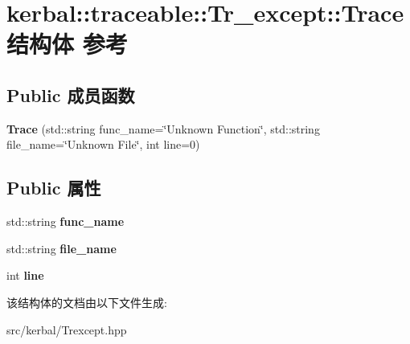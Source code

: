 \hypertarget{structkerbal_1_1traceable_1_1_tr__except_1_1_trace}{}\section{kerbal\+:\+:traceable\+:\+:Tr\+\_\+except\+:\+:Trace结构体 参考}
\label{structkerbal_1_1traceable_1_1_tr__except_1_1_trace}
\subsection*{Public 成员函数}
\begin{DoxyCompactItemize}
\item 
\mbox{\label{structkerbal_1_1traceable_1_1_tr__except_1_1_trace_aacad5214700c1ede35b8f040d396e415}} 
{\bfseries Trace} (std\+::string func\+\_\+name=\char`\"{}Unknown Function\char`\"{}, std\+::string file\+\_\+name=\char`\"{}Unknown File\char`\"{}, int line=0)
\end{DoxyCompactItemize}
\subsection*{Public 属性}
\begin{DoxyCompactItemize}
\item 
\mbox{\label{structkerbal_1_1traceable_1_1_tr__except_1_1_trace_a4946f32b070a0bc288acfbe982154a0a}} 
std\+::string {\bfseries func\+\_\+name}
\item 
\mbox{\label{structkerbal_1_1traceable_1_1_tr__except_1_1_trace_a8dbad22ac15fbae1c3d8bd8d03520572}} 
std\+::string {\bfseries file\+\_\+name}
\item 
\mbox{\label{structkerbal_1_1traceable_1_1_tr__except_1_1_trace_a11bd6453d09569ee05832e73b45507d0}} 
int {\bfseries line}
\end{DoxyCompactItemize}


该结构体的文档由以下文件生成\+:\begin{DoxyCompactItemize}
\item 
src/kerbal/Trexcept.\+hpp\end{DoxyCompactItemize}
